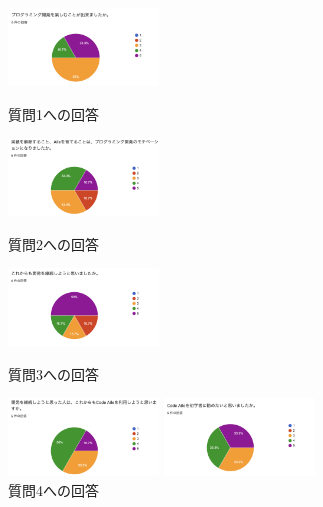 \documentclass[12pt,twoside]{jbook}
\begin{document}

\begin{figure}[t]
  \hfill
  \begin{minipage}[b]{0.48\linewidth}
    \centering
    \includegraphics[width=4cm]{images/q1}
    \caption{質問1への回答}
    \label{fig:q1}
  \end{minipage}
  \hfill
  \begin{minipage}[b]{0.48\linewidth}
    \centering
    \includegraphics[width=4cm]{images/q2}
    \caption{質問2への回答}
    \label{fig:q2}
  \end{minipage}
  \hfill
  \begin{minipage}[b]{0.48\linewidth}
    \centering
    \includegraphics[width=4cm]{images/q3}
    \caption{質問3への回答}
    \label{fig:q3}
  \end{minipage}
  \hfill
  \begin{minipage}[b]{0.48\linewidth}
    \centering
    \includegraphics[width=4cm]{images/q4}
    \caption{質問4への回答}
    \label{fig:q4}
  \end{minipage}
  \hfill
  \begin{minipage}[b]{0.48\linewidth}
    \centering
    \includegraphics[width=4cm]{images/q5}

\end{minipage}
\end{figure}
\end{document}
